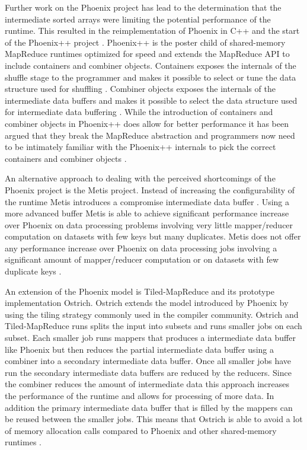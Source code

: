 \documentclass[11pt]{article}       %
\begin{document}
Further work on the Phoenix project has lead to the determination that the
intermediate sorted arrays were limiting the potential performance of the
runtime. This resulted in the reimplementation of Phoenix in C++ and the start
of the Phoenix++ project \cite{Phoenix++}. Phoenix++ is the poster child of
shared-memory MapReduce runtimes optimized for speed and extends the MapReduce
API to include containers and combiner objects. Containers exposes the internals
of the shuffle stage to the programmer and makes it possible to select or tune
the data structure used for shuffling \cite{Phoenix++}. Combiner objects exposes
the internals of the intermediate data buffers and makes it possible to select
the data structure used for intermediate data buffering \cite{Phoenix++}. While
the introduction of containers and combiner objects in Phoenix++ does allow for
better performance it has been argued that they break the MapReduce abstraction
and programmers now need to be intimately familiar with the Phoenix++ internals
to pick the correct containers and combiner objects \cite{CilkMR}.

An alternative approach to dealing with the perceived shortcomings of the
Phoenix project is the Metis project. Instead of increasing the configurability
of the runtime Metis introduces a compromise intermediate data buffer
\cite{Metis}. Using a more advanced buffer Metis is able to achieve significant
performance increase over Phoenix on data processing problems involving very
little mapper/reducer computation on datasets with few keys but many duplicates.
Metis does not offer any performance increase over Phoenix on data processing
jobs involving a significant amount of mapper/reducer computation or on datasets
with few duplicate keys \cite{Metis}.

An extension of the Phoenix model is Tiled-MapReduce and its prototype
implementation Ostrich. Ostrich extends the model introduced by Phoenix by using
the tiling strategy commonly used in the compiler community. Ostrich and
Tiled-MapReduce runs splits the input into subsets and runs smaller jobs on each
subset. Each smaller job runs mappers that produces a intermediate data buffer
like Phoenix but then reduces the partial intermediate data buffer using a
combiner into a secondary intermediate data buffer. Once all smaller jobs have
run the secondary intermediate data buffers are reduced by the reducers. Since
the combiner reduces the amount of intermediate data this approach increases the
performance of the runtime and allows for processing of more data. In addition
the primary intermediate data buffer that is filled by the mappers can be reused
between the smaller jobs. This means that Ostrich is able to avoid a lot of
memory allocation calls compared to Phoenix and other shared-memory runtimes
\cite{Ostrich}.
\end{document}
